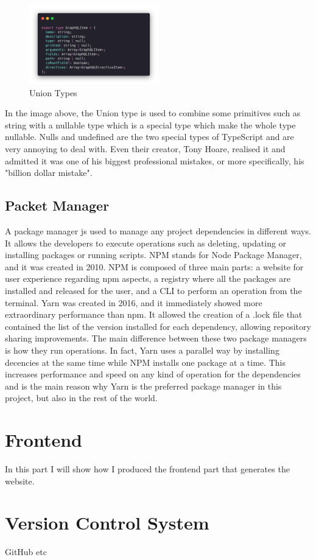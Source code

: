 \begin{figure}[H]
  \centering
  \includegraphics[width=0.5\textwidth]{figures/code/union-types.png}
  \caption{Union Types}
  \label{f:ch5-refactored-union-types}
\end{figure}

In the image above, the Union type is used to combine some primitives such as
string with a nullable type which is a special type which make the whole type
nullable. Nulls and undefined are the two special types of TypeScript and are
very annoying to deal with. Even their creator, Tony Hoare, realised it and
admitted it was one of his biggest professional mistakes, or more specifically,
his "billion dollar mistake".

\subsection{Packet Manager}
\label{ss:Packet-Manager}

A package manager js used to manage any project dependencies in different ways.
It allows the developers to execute operations such as deleting, updating or
installing packages or running scripts. NPM stands for Node Package Manager, and
it was created in 2010. NPM is composed of three main parts: a website for user
experience regarding npm aspects, a registry where all the packages are
installed and released for the user, and a CLI to perform an operation from the
terminal. Yarn was created in 2016, and it immediately showed more extraordinary
performance than npm. It allowed the creation of a .lock file that contained the
list of the version installed for each dependency, allowing repository sharing
improvements. The main difference between these two package managers is how they
run operations. In fact, Yarn uses a parallel way by installing decencies at the
same time while NPM installs one package at a time. This increases performance
and speed on any kind of operation for the dependencies and is the main reason
why Yarn is the preferred package manager in this project, but also in the rest
of the world.

\section{Frontend}
\label{s:Frontend}
In this part I will show how I produced the frontend part that generates the
website.

\section{Version Control System}
\label{s:Version-Control-System}
GitHub etc

